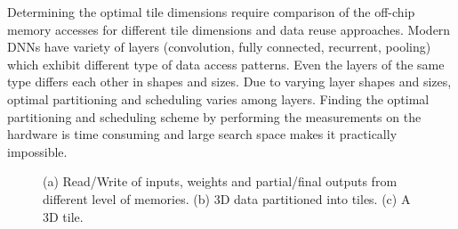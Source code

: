 \documentclass[a4paper,10pt]{article}
\begin{document}
Determining the optimal tile dimensions require comparison of the off-chip memory accesses for different tile dimensions and data reuse approaches. Modern DNNs have variety of layers (convolution, fully connected, recurrent, pooling) which exhibit different type of data access patterns. Even the layers of the same type differs each other in shapes and sizes. Due to varying layer shapes and sizes, optimal partitioning and scheduling varies among layers. Finding the optimal partitioning and scheduling scheme by performing the measurements on the hardware is time consuming and large search space makes it practically impossible.
\begin{figure}[!htb]
	\centering
	\hfil	
	\hfil
   \hfil	
	\caption{(a) Read/Write of inputs, weights and partial/final outputs from different level of memories. (b) 3D data partitioned into tiles. (c) A 3D tile.}
	\label{fig:nnLayerData}
	\vspace{-1.0em}	
\end{figure}
\end{document}
